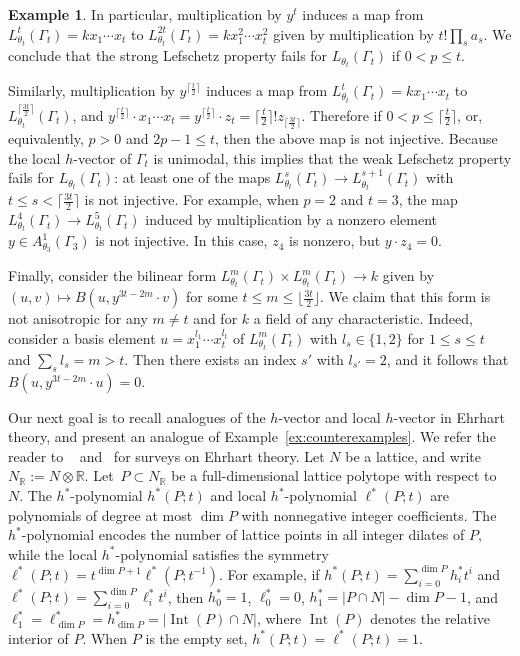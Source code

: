 \documentclass[11pt]{article}
\theoremstyle{definition}
\newtheorem{example}[theo]{Example}
\numberwithin{equation}{section}
\def\R{\mathbb{R}}
\DeclareMathOperator{\Int}{Int}
\numberwithin{equation}{section}
\begin{document}
\begin{example}
In particular, 
multiplication by $y^t$ induces a map from $L^t_{\theta_t}(\Gamma_t) = k x_1\cdots x_t$ to  $L^{2t}_{\theta_t}(\Gamma_t) = k x_1^2\cdots x_t^2$ given by multiplication by $t! \prod_s a_s$. We conclude that the strong Lefschetz property fails for  $L_{\theta_t}(\Gamma_t)$ if $0 < p \le t$. 

Similarly, multiplication by $y^{\lceil \frac{t}{2} \rceil}$ induces a map from $L^t_{\theta_t}(\Gamma_t) = k x_1\cdots x_t$ to  $L^{\lceil \frac{3t}{2} \rceil}_{\theta_t}(\Gamma_t)$, and 
$y^{\lceil \frac{t}{2} \rceil} \cdot x_1\cdots x_t = y^{\lceil \frac{t}{2} \rceil} \cdot z_t = \lceil \frac{t}{2} \rceil! z_{\lceil \frac{3t}{2} \rceil}$. Therefore if $0 < p \le \lceil \frac{t}{2} \rceil$, or, equivalently, $p > 0$ and $2p - 1 \le t$, then the above map is not injective. Because the local $h$-vector of $\Gamma_{t}$ is unimodal, this implies that the weak Lefschetz property fails for  $L_{\theta_t}(\Gamma_t)$: at least one of the maps $L_{\theta_t}^{s}(\Gamma_t) \to L_{\theta_t}^{s+1}(\Gamma_t)$ with $t \le s < \lceil \frac{3t}{2} \rceil$ is not injective. For example, when $p = 2$ and $t = 3$, the map $L^4_{\theta_t}(\Gamma_t) \to L^5_{\theta_t}(\Gamma_t)$ induced by multiplication by a nonzero element $y \in A_{\theta_3}^1(\Gamma_3)$ is not injective. In this case, $z_4$ is nonzero, but $y \cdot z_4 = 0$. 

Finally, consider the bilinear form  $L_{\theta_t}^m(\Gamma_t) \times L_{\theta_t}^m(\Gamma_t)  \to k$ given by $(u, v) \mapsto B(u, y^{3t-2m} \cdot v)$ for some $t \le m \le \lfloor \frac{3t}{2} \rfloor$. We claim that this form is not anisotropic for any $m \neq t$ and for $k$ a field of any characteristic. Indeed, consider a basis element $u = x_1^{l_1}\cdots x_t^{l_t}$ of $L_{\theta_t}^m(\Gamma_t)$ with  $l_s \in \{ 1,2 \}$ for  $1 \le s \le t$ and $\sum_s l_s = m > t$. Then there exists an index $s'$ with $l_{s'} = 2$, and it follows that $B(u, y^{3t-2m} \cdot u) = 0$. 
\end{example}

Our next goal is to recall analogues of the $h$-vector and local $h$-vector in Ehrhart theory, and present an analogue of Example~\ref{ex:counterexamples}. We refer the reader to ~\cite{BarvinokIntegerPolyhedra} and~\cite{BeckRobinsComputing}  for surveys on Ehrhart theory. 
Let $N$ be a lattice, and write $N_\R := N \otimes \R$. 
Let~$P \subset N_\R$ be a full-dimensional lattice polytope with respect to $N$. The $h^*$-polynomial $h^*(P;t)$ and local $h^*$-polynomial $\ell^*(P;t)$  are polynomials of degree at most $\dim P$ with nonnegative integer coefficients. The $h^*$-polynomial
encodes the number of lattice points in all integer dilates of $P$, while the local $h^*$-polynomial satisfies 
the symmetry 
$\ell^*(P;t) = t^{\dim P + 1}\ell^*(P;t^{-1})$. 
For example, if $h^*(P;t) = \sum_{i = 0}^{\dim P} h^*_i t^i$ and $\ell^*(P;t) = \sum_{i = 0}^{\dim P} \ell^*_i t^i$, then $h_0^* = 1$, $\ell_0^* = 0$,  $h_1^* = |P \cap N| - \dim P - 1$, and $\ell_1^* = \ell_{\dim P}^* =  h_{\dim P}^* =  |\Int(P) \cap N|$, where $\Int(P)$ denotes the relative interior of $P$.
When $P$ is the empty set,  $h^*(P;t) = \ell^*(P;t) = 1$.
\end{document}
